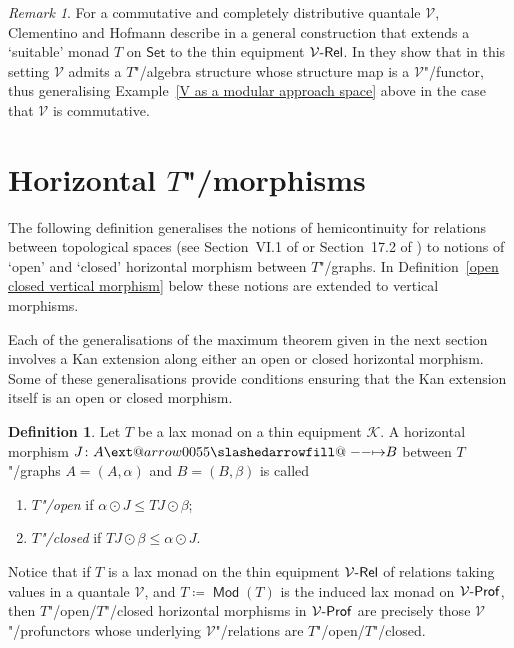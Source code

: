 \documentclass[preprint, a4paper]{elsarticle}
\makeatletter
\def\slashedarrowfill@#1#2#3#4#5{%
  $\m@th\thickmuskip0mu\medmuskip\thickmuskip\thinmuskip\thickmuskip
   \relax#5#1\mkern-7mu%
   \cleaders\hbox{$#5\mkern-2mu#2\mkern-2mu$}\hfill
   \mathclap{#3}\mathclap{#2}%
   \cleaders\hbox{$#5\mkern-2mu#2\mkern-2mu$}\hfill
   \mkern-7mu#4$%
}
\def\rightslashedarrowfill@{%
  \slashedarrowfill@\relbar\relbar\mapstochar\rightarrow}
\newcommand\xslashedrightarrow[2][]{%
  \ext@arrow 0055{\rightslashedarrowfill@}{#1}{#2}}
\def\slashedrightarrow{\xslashedrightarrow{}}
\theoremstyle{definition}
\newtheorem{definition}[theorem]{Definition}
\theoremstyle{remark}
\newtheorem{remark}[theorem]{Remark}
\providecommand{\defref}[1]{Definition~\ref{#1}}
\providecommand{\exref}[1]{Example~\ref{#1}}
\providecommand{\dfn}{\coloneqq}
\providecommand{\hmap}[3]{#1\colon#2\slashedrightarrow#3}
\providecommand{\catvar}[1]{\mathcal{#1}}
\providecommand{\2}{\mathsf 2}
\providecommand{\K}{\catvar K}
\providecommand{\V}{\catvar V}
\providecommand{\Set}{\mathsf{Set}}
\providecommand{\Rel}{\mathsf{Rel}}
\providecommand{\enRel}[1]{#1\text-\Rel}
\DeclareMathOperator{\Mod}{\mathsf{Mod}}
\providecommand{\Prof}{\mathsf{Prof}}
\providecommand{\enProf}[1]{#1\text-\Prof}
\providecommand{\hc}{\odot}
\makeatother
\begin{document}
	\begin{remark}
		For a commutative and completely distributive quantale $\V$, Clementino and Hofmann describe in \cite{Clementino-Hofmann04} a general construction that extends a `suitable' monad $T$ on $\Set$ to the thin equipment $\enRel\V$. In \cite{Clementino-Hofmann09} they show that in this setting $\V$ admits a $T$"/algebra structure whose structure map is a $\V$"/functor, thus generalising \exref{V as a modular approach space} above in the case that $\V$ is commutative.
	\end{remark}
	
	\section{Horizontal \texorpdfstring{$T$}{T}"/morphisms} \label{horizontal T-morphisms}
	The following definition generalises the notions of hemicontinuity for relations between topological spaces (see Section~VI.1 of \cite{Berge59} or Section~17.2 of \cite{Aliprantis-Border06}) to notions of `open' and `closed' horizontal morphism between $T$"/graphs. In \defref{open closed vertical morphism} below these notions are extended to vertical morphisms.
	
	Each of the generalisations of the maximum theorem given in the next section involves a Kan extension along either an open or closed horizontal morphism. Some of these generalisations provide conditions ensuring that the Kan extension itself is an open or closed morphism.
	\begin{definition} \label{open closed horizontal morphism}
		Let $T$ be a lax monad on a thin equipment $\K$. A horizontal morphism $\hmap JAB$ between $T$"/graphs $A = (A, \alpha)$ and $B = (B, \beta)$ is called
		\begin{enumerate}[label=-]
			\item \emph{$T$"/open} if $\alpha \hc J \leq TJ \hc \beta$;
			\item \emph{$T$"/closed} if $TJ \hc \beta \leq \alpha \hc J$.
		\end{enumerate}
	\end{definition}
	Notice that if $T$ is a lax monad on the thin equipment $\enRel\V$ of relations taking values in a quantale $\V$, and $T \dfn \Mod(T)$ is the induced lax monad on $\enProf\V$, then $T$"/open/$T$"/closed horizontal morphisms in $\enProf\V$ are precisely those $\V$"/profunctors whose underlying $\V$"/relations are $T$"/open/$T$"/closed.
	
\end{document}

